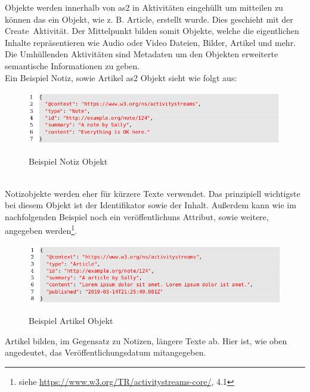 {	Objekte werden innerhalb von \gls{as2} in Aktivitäten eingehüllt um mitteilen zu können das ein Objekt, wie z. B. \glqq Article\grqq, erstellt wurde. Dies geschieht mit der \glqq Create\grqq~Aktivität. Der Mittelpunkt bilden somit Objekte, welche die eigentlichen Inhalte repräsentieren wie Audio oder Video Dateien, Bilder, Artikel und mehr. Die Umhüllenden Aktivitäten sind Metadaten um den Objekten erweiterte semantische Informationen zu geben.~\\
	
	Ein Beispiel Notiz, sowie Artikel \gls{as2} Objekt sieht wie folgt aus:~\\
	\begin{figure}[h]
		\begin{minipage}{\textwidth}
			\centering
			\includegraphics[scale=0.5]{figures/object-note.png}
			\label{fig:object-note}
			\caption{Beispiel Notiz Objekt}
		\end{minipage}
	\end{figure}~\\
	Notizobjekte werden eher für kürzere Texte verwendet. Das prinzipiell wichtigste bei diesem Objekt ist der Identifikator sowie der Inhalt. Außerdem kann wie im nachfolgenden Beispiel noch ein veröffentlichuns Attribut, sowie weitere, angegeben werden\footnote{siehe \url{https://www.w3.org/TR/activitystreams-core/}, 4.1}.
	\begin{figure}[h]
		\begin{minipage}{\textwidth}
			\centering
			\includegraphics[scale=0.5]{figures/object-article.png}
			\label{fig:object-article}
			\caption{Beispiel Artikel Objekt}
		\end{minipage}
	\end{figure}
	Artikel bilden, im Gegensatz zu Notizen, längere Texte ab. Hier ist, wie oben angedeutet, das Veröffentlichungsdatum mitangegeben.~\\
	
}
